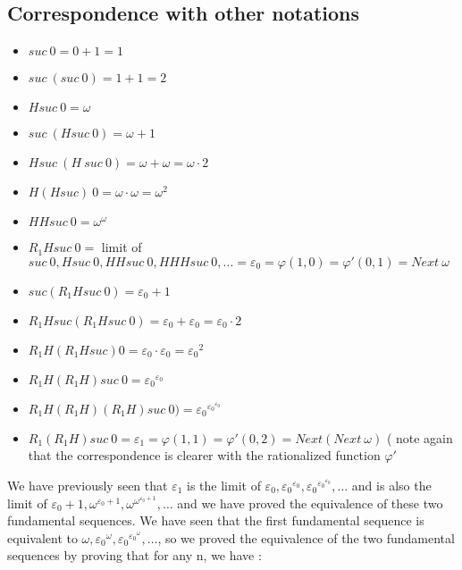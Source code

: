 \documentclass[10pt]{article}
\begin{document}
\subsection{Correspondence with other notations}

\begin{itemize}
     \setlength{\itemsep}{1pt}
     \setlength{\parskip}{0pt}
     \setlength{\parsep}{0pt}

\item \( suc\ 0 = 0 + 1 = 1 \)
\item \( suc\ (suc\ 0) = 1 + 1 = 2 \)
\item \( H suc\ 0 = \omega \)
\item \( suc\ (H suc\ 0) = \omega + 1 \)
\item \( H suc\ (H\ suc\ 0) = \omega + \omega = \omega \cdot 2 \)
\item \( H (H suc)\ 0 = \omega \cdot \omega = \omega^2 \)
\item \( H H suc\ 0 = \omega^\omega \)
\item \( R_1 H suc\ 0 = \) limit of \( suc\ 0, H suc\ 0, H H suc\ 0, H H H suc\ 0, \ldots = \varepsilon_0 = \varphi(1,0) = \varphi'(0,1) = Next\ \omega \)
\item \( suc (R_1 H suc\ 0) = \varepsilon_0 + 1 \)
\item \( R_1 H suc (R_1 H suc\ 0) = \varepsilon_0 + \varepsilon_0 = \varepsilon_0 \cdot 2 \)
\item \( R_1 H (R_1 H suc) 0 = \varepsilon_0 \cdot \varepsilon_0 = {\varepsilon_0}^2 \)
\item \( R_1 H (R_1 H) suc\ 0 = {\varepsilon_0}^{\varepsilon_0} \)
\item \( R_1 H (R_1 H) (R_1 H) suc\ 0 ) = {\varepsilon_0}^{{\varepsilon_0}^{\varepsilon_0}} \)
\item \( R_1 (R_1 H) suc\ 0 = \varepsilon_1 = \varphi(1,1) = \varphi'(0,2) = Next (Next\ \omega) \) ( note again that the correspondence is clearer with the rationalized function \( \varphi' \)

\end{itemize}

We have previously seen that \( \varepsilon_1 \) is the limit of \( \varepsilon_0, {\varepsilon_0}^{\varepsilon_0}, {\varepsilon_0}^{{\varepsilon_0}^{\varepsilon_0}}, \ldots \) and is also the limit of \( \varepsilon_0+1, \omega^{\varepsilon_0+1}, \omega^{\omega^{\varepsilon_0+1}}, \ldots \) and we have proved the equivalence of these two fundamental sequences. We have seen that the first fundamental sequence is equivalent to \( \omega, {\varepsilon_0}^\omega, {\varepsilon_0}^{{\varepsilon_0}^\omega}, \ldots \), so we proved the equivalence of the two fundamental sequences by proving that for any n, we have :
\end{document}
